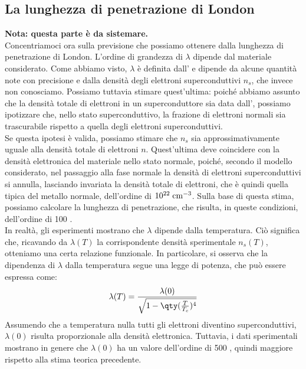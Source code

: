 \subsection{La lunghezza di penetrazione di London}
\textbf{Nota: questa parte è da sistemare.}\\
Concentriamoci ora sulla previsione che possiamo ottenere dalla lunghezza di penetrazione di London. L'ordine di grandezza di $\lambda$ dipende dal materiale considerato. Come abbiamo visto, $\lambda$ è definita dall' e dipende da alcune quantità note con precisione e dalla densità degli elettroni superconduttivi $n_s$, che invece non conosciamo. Possiamo tuttavia stimare quest'ultima: poiché abbiamo assunto che la densità totale di elettroni in un superconduttore sia data dall', possiamo ipotizzare che, nello stato superconduttivo, la frazione di elettroni normali sia trascurabile rispetto a quella degli elettroni superconduttivi.\\
Se questa ipotesi è valida, possiamo stimare che $n_s$ sia approssimativamente uguale alla densità totale di elettroni $n$. Quest'ultima deve coincidere con la densità elettronica del materiale nello stato normale, poiché, secondo il modello considerato, nel passaggio alla fase normale la densità di elettroni superconduttivi si annulla, lasciando invariata la densità totale di elettroni, che è quindi quella tipica del metallo normale, dell'ordine di $10^{22} \; \rm cm^{-3}$. Sulla base di questa stima, possiamo calcolare la lunghezza di penetrazione, che risulta, in queste condizioni, dell'ordine di 100 \A.\\
In realtà, gli esperimenti mostrano che $\lambda$ dipende dalla temperatura. Ciò significa che, ricavando da $\lambda(T)$ la corrispondente densità sperimentale $n_s(T)$, otteniamo una certa relazione funzionale. In particolare, si osserva che la dipendenza di $\lambda$ dalla temperatura segue una legge di potenza, che può essere espressa come:
\begin{equation*}
   \lambda(T)
   =\frac{\lambda(0)}{\sqrt{ 1 - \qty(\frac{T}{T_c})^{4}}}
\end{equation*}
Assumendo che a temperatura nulla tutti gli elettroni diventino superconduttivi, $\lambda(0)$ risulta proporzionale alla densità elettronica. Tuttavia, i dati sperimentali mostrano in genere che $\lambda(0)$ ha un valore dell'ordine di 500 \A, quindi maggiore rispetto alla stima teorica precedente.\\
